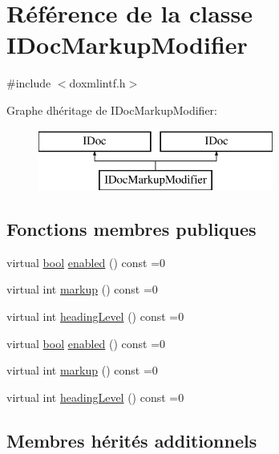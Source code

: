 \hypertarget{class_i_doc_markup_modifier}{}\section{Référence de la classe I\+Doc\+Markup\+Modifier}
\label{class_i_doc_markup_modifier}


{\ttfamily \#include $<$doxmlintf.\+h$>$}

Graphe d\textquotesingle{}héritage de I\+Doc\+Markup\+Modifier\+:\begin{figure}[H]
\begin{center}
\leavevmode
\includegraphics[height=2.000000cm]{class_i_doc_markup_modifier}
\end{center}
\end{figure}
\subsection*{Fonctions membres publiques}
\begin{DoxyCompactItemize}
\item 
virtual \hyperlink{qglobal_8h_a1062901a7428fdd9c7f180f5e01ea056}{bool} \hyperlink{class_i_doc_markup_modifier_ae7f3f92875d4f10caca5a2a13a0e9c25}{enabled} () const  =0
\item 
virtual int \hyperlink{class_i_doc_markup_modifier_ad1af8547b9a416fb9d02d32498b761cb}{markup} () const  =0
\item 
virtual int \hyperlink{class_i_doc_markup_modifier_a210d6ce0de717b77c66770e958323ae8}{heading\+Level} () const  =0
\item 
virtual \hyperlink{qglobal_8h_a1062901a7428fdd9c7f180f5e01ea056}{bool} \hyperlink{class_i_doc_markup_modifier_ae7f3f92875d4f10caca5a2a13a0e9c25}{enabled} () const  =0
\item 
virtual int \hyperlink{class_i_doc_markup_modifier_ad1af8547b9a416fb9d02d32498b761cb}{markup} () const  =0
\item 
virtual int \hyperlink{class_i_doc_markup_modifier_a210d6ce0de717b77c66770e958323ae8}{heading\+Level} () const  =0
\end{DoxyCompactItemize}
\subsection*{Membres hérités additionnels}



